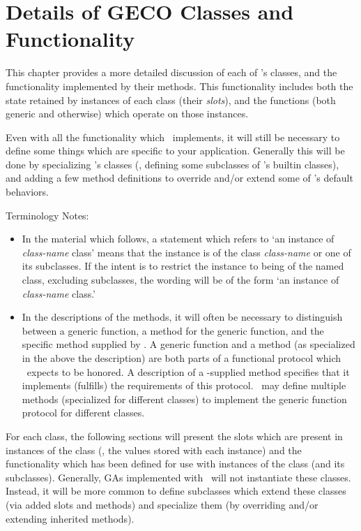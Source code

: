 \chapter{Details of GECO Classes and Functionality}

This chapter provides a more detailed discussion of each of \geco's 
classes, and the functionality implemented by their methods.   This functionality 
includes both the state retained by instances of each class (their {\em slots}),
and the functions (both generic and otherwise) which operate on those instances.

Even with all the functionality which \geco\ implements, it will still be
necessary to define some things which are specific to your application.
Generally this will be done by specializing \geco's classes (\ie, defining
some subclasses of \geco's builtin classes), and adding a few method
definitions to override and/or extend some of \geco's default behaviors.

Terminology Notes:

\begin{itemize}

\item In the material which follows, a statement which refers to `an instance of
 {\it class-name} class' means that the instance is of the class
{\it class-name} or one of its subclasses. If the intent is to restrict the
instance to being of the named class, excluding subclasses, the wording will be
of the form `an instance of  {\it class-name} class.'

\item In the descriptions of the methods, it will often be necessary to
distinguish between a generic function, a method for the generic function, and
the specific method supplied by \geco. A generic function and a method (as
specialized in the  above the description) are both parts of a
functional protocol which \geco\ expects to be honored.  A description
of a \geco-supplied method specifies that it
implements (fulfills) the requirements of this protocol.  \Geco\ may
define multiple methods (specialized for different classes) to implement
the generic function protocol for different classes.

\end{itemize}

For each class, the following sections will present the slots which 
are present in instances of the class (\ie, the values stored with each 
instance) and the functionality which has been defined for use with 
instances of the class (and its subclasses).
Generally, GAs implemented with \geco\ will not instantiate these classes.  
Instead, it will be more common to define subclasses which extend these 
classes (via added slots and methods) and specialize them (by overriding 
and/or extending inherited methods).


